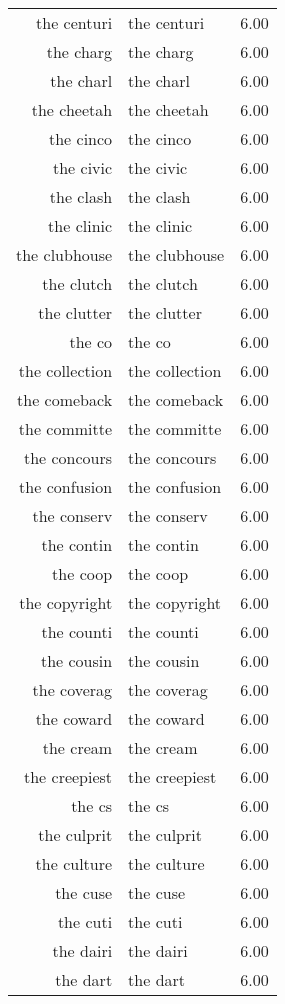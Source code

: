 \begin{table}[ht]
\begin{tabular}{rlr}
  the centuri & the centuri & 6.00 \\ 
  the charg & the charg & 6.00 \\ 
  the charl & the charl & 6.00 \\ 
  the cheetah & the cheetah & 6.00 \\ 
  the cinco & the cinco & 6.00 \\ 
  the civic & the civic & 6.00 \\ 
  the clash & the clash & 6.00 \\ 
  the clinic & the clinic & 6.00 \\ 
  the clubhouse & the clubhouse & 6.00 \\ 
  the clutch & the clutch & 6.00 \\ 
  the clutter & the clutter & 6.00 \\ 
  the co & the co & 6.00 \\ 
  the collection & the collection & 6.00 \\ 
  the comeback & the comeback & 6.00 \\ 
  the committe & the committe & 6.00 \\ 
  the concours & the concours & 6.00 \\ 
  the confusion & the confusion & 6.00 \\ 
  the conserv & the conserv & 6.00 \\ 
  the contin & the contin & 6.00 \\ 
  the coop & the coop & 6.00 \\ 
  the copyright & the copyright & 6.00 \\ 
  the counti & the counti & 6.00 \\ 
  the cousin & the cousin & 6.00 \\ 
  the coverag & the coverag & 6.00 \\ 
  the coward & the coward & 6.00 \\ 
  the cream & the cream & 6.00 \\ 
  the creepiest & the creepiest & 6.00 \\ 
  the cs & the cs & 6.00 \\ 
  the culprit & the culprit & 6.00 \\ 
  the culture & the culture & 6.00 \\ 
  the cuse & the cuse & 6.00 \\ 
  the cuti & the cuti & 6.00 \\ 
  the dairi & the dairi & 6.00 \\ 
  the dart & the dart & 6.00 \\ 

\end{tabular}
\end{table}
